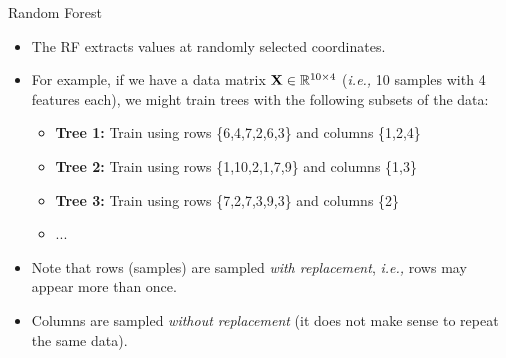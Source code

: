 \documentclass[10pt, aspectratio=169]{beamer} %
\newcommand{\R}{{\mathbb{R}}}
\newcommand{\X}{{\bf X}}
\begin{document}
\begin{frame}{Random Forest}
\begin{itemize}
\item The RF extracts values at randomly selected coordinates.
\item For example, if we have a data matrix $\X \in \R^{10\times 4}$ (\emph{i.e.,} 10 samples with 4 features each), we might train trees with the
following subsets of the data:
\begin{itemize}
\item \textbf{Tree 1:} Train using rows \{6,4,7,2,6,3\} and columns \{1,2,4\}
\item \textbf{Tree 2:} Train using rows \{1,10,2,1,7,9\} and columns \{1,3\}
\item \textbf{Tree 3:} Train using rows \{7,2,7,3,9,3\} and columns \{2\}
\item ...
\end{itemize}
\item Note that rows (samples) are sampled \emph{with replacement}, \emph{i.e.,} rows may appear more than once. 
\item Columns are sampled \emph{without replacement} (it does not make sense to repeat the same data).
\end{itemize}
\end{frame}
\end{document}
